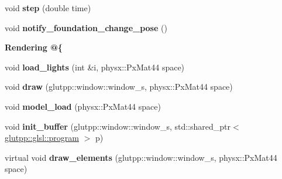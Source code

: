 \begin{DoxyCompactItemize}
\item 
\hypertarget{classglutpp_1_1shape_1_1shape_a510a7f5698283d60203f3e436dbf5437}{void {\bfseries step} (double time)}\label{classglutpp_1_1shape_1_1shape_a510a7f5698283d60203f3e436dbf5437}

\item 
\hypertarget{classglutpp_1_1shape_1_1shape_ab30cd62c6b82b7554c75c888128af643}{void {\bfseries notify\-\_\-foundation\-\_\-change\-\_\-pose} ()}\label{classglutpp_1_1shape_1_1shape_ab30cd62c6b82b7554c75c888128af643}

\end{DoxyCompactItemize}
\begin{Indent}{\bf \-Rendering @\{}\par
\begin{DoxyCompactItemize}
\item 
\hypertarget{classglutpp_1_1shape_1_1shape_ab59d62900fa186e3ed898aa54e21adb1}{void {\bfseries load\-\_\-lights} (int \&i, physx\-::\-Px\-Mat44 space)}\label{classglutpp_1_1shape_1_1shape_ab59d62900fa186e3ed898aa54e21adb1}

\item 
\hypertarget{classglutpp_1_1shape_1_1shape_a52bdb1e55946a6a264358ba84073baa1}{void {\bfseries draw} (glutpp\-::window\-::window\-\_\-s, physx\-::\-Px\-Mat44 space)}\label{classglutpp_1_1shape_1_1shape_a52bdb1e55946a6a264358ba84073baa1}

\item 
\hypertarget{classglutpp_1_1shape_1_1shape_ad3f642bee81fc4976f236efffb2aebb7}{void {\bfseries model\-\_\-load} (physx\-::\-Px\-Mat44 space)}\label{classglutpp_1_1shape_1_1shape_ad3f642bee81fc4976f236efffb2aebb7}

\item 
\hypertarget{classglutpp_1_1shape_1_1shape_a892f5bc48dc85c0e563d3a2d36d0a6a7}{void {\bfseries init\-\_\-buffer} (glutpp\-::window\-::window\-\_\-s, std\-::shared\-\_\-ptr$<$ \hyperlink{classglutpp_1_1glsl_1_1program}{glutpp\-::glsl\-::program} $>$ p)}\label{classglutpp_1_1shape_1_1shape_a892f5bc48dc85c0e563d3a2d36d0a6a7}

\item 
\hypertarget{classglutpp_1_1shape_1_1shape_adc614843f48e9eebf2ce9de23d6ee8f2}{virtual void {\bfseries draw\-\_\-elements} (glutpp\-::window\-::window\-\_\-s, physx\-::\-Px\-Mat44 space)}\label{classglutpp_1_1shape_1_1shape_adc614843f48e9eebf2ce9de23d6ee8f2}

\end{DoxyCompactItemize}
\end{Indent}
